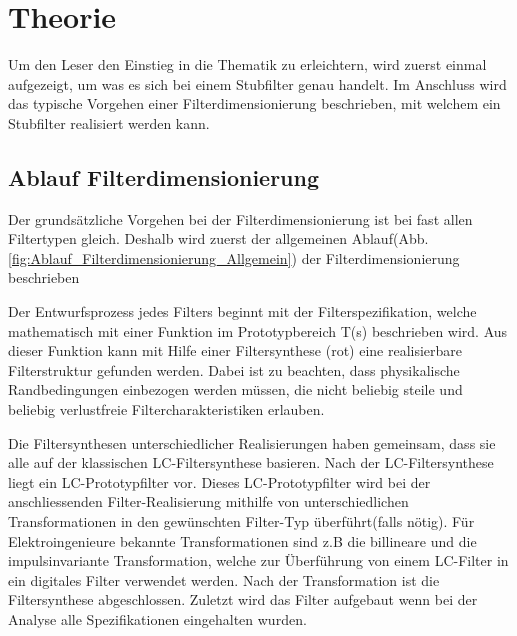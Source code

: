 \section{Theorie}

Um den  Leser  den Einstieg in die Thematik zu erleichtern, wird zuerst einmal
aufgezeigt, um  was  es  sich bei einem Stubfilter genau handelt. Im Anschluss
wird  das  typische  Vorgehen  einer  Filterdimensionierung  beschrieben,  mit
welchem ein Stubfilter realisiert werden kann.







\subsection{Ablauf Filterdimensionierung}

Der grundsätzliche Vorgehen bei der Filterdimensionierung ist bei fast allen Filtertypen gleich. Deshalb wird zuerst der allgemeinen Ablauf(Abb.\ref{fig:Ablauf_Filterdimensionierung_Allgemein}) der Filterdimensionierung beschrieben 

Der Entwurfsprozess jedes Filters beginnt mit der Filterspezifikation, welche mathematisch mit einer Funktion im Prototypbereich T(s) beschrieben wird. Aus dieser Funktion kann mit Hilfe einer Filtersynthese (rot) eine realisierbare Filterstruktur gefunden werden. Dabei ist zu beachten, dass  physikalische Randbedingungen einbezogen werden müssen, die nicht beliebig steile und beliebig verlustfreie Filtercharakteristiken erlauben.

Die Filtersynthesen unterschiedlicher Realisierungen haben gemeinsam, dass sie alle auf der klassischen LC-Filtersynthese basieren. Nach der LC-Filtersynthese liegt ein LC-Prototypfilter vor. Dieses LC-Prototypfilter wird bei der anschliessenden Filter-Realisierung mithilfe von unterschiedlichen Transformationen in den gewünschten Filter-Typ überführt(falls nötig). Für Elektroingenieure bekannte Transformationen sind z.B die billineare und die impulsinvariante Transformation, welche zur Überführung von einem LC-Filter in ein digitales Filter verwendet werden. Nach der Transformation ist die Filtersynthese abgeschlossen. Zuletzt wird das Filter aufgebaut wenn bei der Analyse alle Spezifikationen eingehalten wurden.


